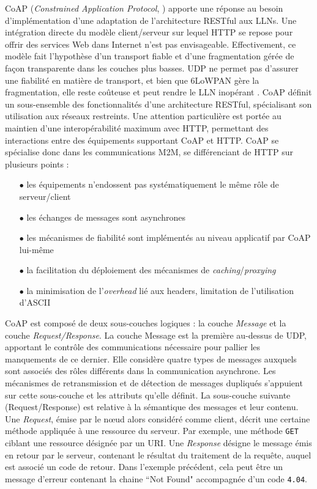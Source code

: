 \documentclass[]{report}
\begin{document}
CoAP (\textit{Constrained Application Protocol}, \cite{rfc7252}) apporte une réponse au besoin d'implémentation d'une adaptation de l'architecture RESTful aux LLNs. Une intégration directe du modèle client/serveur sur lequel HTTP se repose pour offrir des services Web dans Internet n'est pas envisageable. Effectivement, ce modèle fait l'hypothèse d'un transport fiable et d'une fragmentation gérée de façon transparente dans les couches plus basses. UDP ne permet pas d'assurer une fiabilité en matière de transport, et bien que 6LoWPAN gère la fragmentation, elle reste coûteuse et peut rendre le LLN inopérant \cite{stack-IoT}. CoAP définit un sous-ensemble des fonctionnalités d'une architecture RESTful, spécialisant son utilisation aux réseaux restreints. Une attention particulière est portée au maintien d'une interopérabilité maximum avec HTTP, permettant des interactions entre des équipements supportant CoAP et HTTP. CoAP se spécialise donc dans les communications M2M, se différenciant de HTTP sur plusieurs points :
\vspace{0.2cm}
\begin{itemize}
\item[$\bullet$] les équipements n'endossent pas systématiquement le même rôle de serveur/client
\vspace{0.1cm}
\item[$\bullet$] les échanges de messages sont asynchrones
\vspace{0.1cm}
\item[$\bullet$] les mécanismes de fiabilité sont implémentés au niveau applicatif par CoAP lui-même
\vspace{0.1cm}
\item[$\bullet$] la facilitation du déploiement des mécanismes de \textit{caching}/\textit{proxying}
\vspace{0.1cm}
\item[$\bullet$] la minimisation de l'\textit{overhead} lié aux headers, limitation de l'utilisation d'ASCII
\end{itemize}


\par CoAP est composé de deux sous-couches logiques : la couche \textit{Message} et la couche \textit{Request/Response}. La couche Message est la première au-dessus de UDP, apportant le contrôle des communications nécessaire pour pallier les manquements de ce dernier. Elle considère quatre types de messages auxquels sont associés des rôles différents dans la communication asynchrone. Les mécanismes de retransmission et de détection de messages dupliqués s'appuient sur cette sous-couche et les attributs qu'elle définit. La sous-couche suivante (Request/Response) est relative à la sémantique des messages et leur contenu. Une \textit{Request}, émise par le nœud alors considéré comme client, décrit une certaine méthode appliquée à une ressource du serveur. Par exemple, une méthode \texttt{GET} ciblant une ressource désignée par un URI. Une \textit{Response} désigne le message émis en retour par le serveur, contenant le résultat du traitement de la requête, auquel est associé un code de retour. Dans l'exemple précédent, cela peut être un message d'erreur contenant la chaine ``Not Found" accompagnée d'un code \texttt{4.04}.\\
\end{document}
